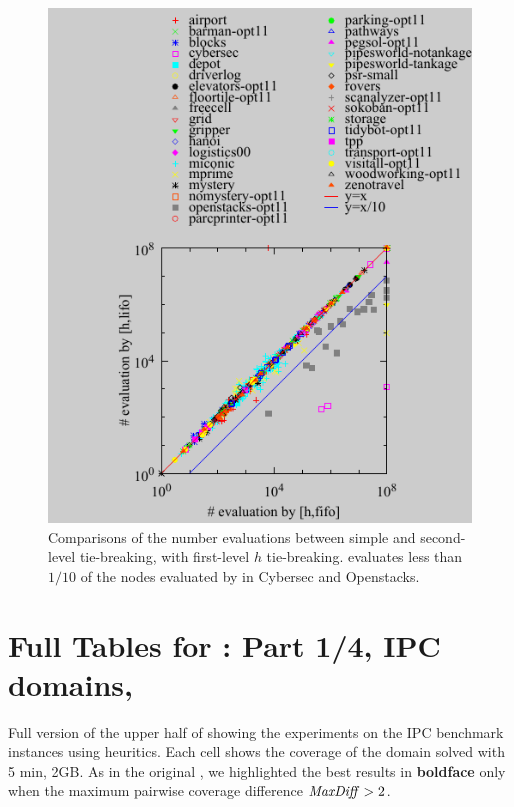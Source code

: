\documentclass[10pt,letterpaper]{article}
\begin{document}
\begin{figure}[htb]
 \centering {}
 \includegraphics{tables/aaai16-30min-5min-cut/aaai16prelim3/evaluated-lmcut_ff-lmcut_lf.pdf}
 \caption{Comparisons of the number evaluations between simple \lifo and
 \fifo second-level tie-breaking, with first-level $h$
 tie-breaking. \lifo evaluates less than $1/10$ of the nodes evaluated
 by \fifo in Cybersec and Openstacks.}
 \label{f-h-eval-full}
\end{figure}

\clearpage
\onecolumn
\section{Full Tables for  : Part 1/4, IPC domains, \lmcut}

\begin{table}[htb]
 {
 \centering
 
 \caption{
 Full version of the upper half of  showing 
 the experiments on the IPC benchmark instances using \lmcut heuritics.
 Each cell shows the coverage of the domain solved with 5 min, 2GB.
 As in the original , we highlighted the best results in
 \textbf{boldface} only when the maximum pairwise coverage difference $\mit{MaxDiff}>2$.
 }
 \label{lmcut-ipc-full}
 }
\end{table}
\end{document}

